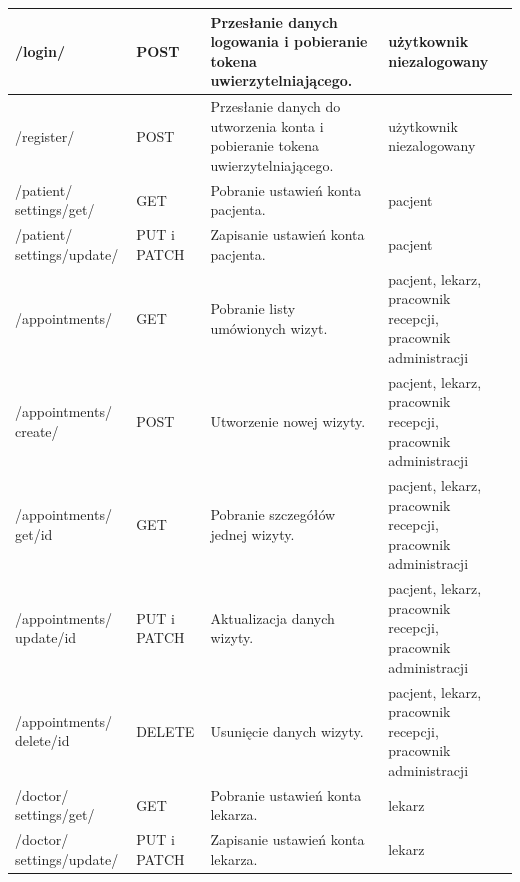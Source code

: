 \documentclass[12pt,oneside]{book}
\begin{document}
\begin{longtable}{|>{\raggedright\arraybackslash}p{3cm}|>{\raggedright\arraybackslash}p{2cm}|>{\raggedright\arraybackslash}p{5cm}|>{\raggedright\arraybackslash}p{3.5cm}|}
        /login/                         & POST                           & Przesłanie danych logowania i pobieranie tokena uwierzytelniającego. & użytkownik niezalogowany \\ \hline
        /register/                      & POST                           & Przesłanie danych do utworzenia konta i pobieranie tokena uwierzytelniającego. & użytkownik niezalogowany \\ \hline
        /patient/ settings/get/         & GET                            & Pobranie ustawień konta pacjenta.                                              & pacjent                                                      \\ \hline
        /patient/ settings/update/      & PUT i PATCH                    & Zapisanie ustawień konta pacjenta.                                             & pacjent                                                      \\ \hline
        /appointments/                  & GET                            & Pobranie listy umówionych wizyt.                                               & pacjent, lekarz, pracownik recepcji, pracownik administracji \\ \hline
        /appointments/ create/          & POST                           & Utworzenie nowej wizyty.                                                       & pacjent, lekarz, pracownik recepcji, pracownik administracji \\ \hline
        /appointments/ get/{id}         & GET                            & Pobranie szczegółów jednej wizyty.                                             & pacjent, lekarz, pracownik recepcji, pracownik administracji \\ \hline
        /appointments/ update/{id}      & PUT i PATCH                    & Aktualizacja danych wizyty.                                                    & pacjent, lekarz, pracownik recepcji, pracownik administracji \\ \hline
        /appointments/ delete/{id}      & DELETE                         & Usunięcie danych wizyty.                                                       & pacjent, lekarz, pracownik recepcji, pracownik administracji \\ \hline
        /doctor/ settings/get/          & GET                            & Pobranie ustawień konta lekarza.                                               & lekarz                                                       \\ \hline
        /doctor/ settings/update/       & PUT i PATCH                    & Zapisanie ustawień konta lekarza.                                              & lekarz                                                       \\ \hline

\end{longtable}
\end{document}
